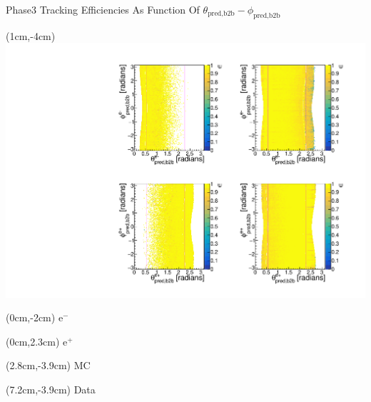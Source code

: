 \documentclass[8pt]{beamer}
\begin{document}
\begin{frame}{Phase3 Tracking Efficiencies As Function Of $\theta_{\textrm{pred,b2b}}-\phi_{\textrm{pred,b2b}}$}
	
	
	
	\begin{textblock*}{9cm}(1cm,-4cm)
		\includegraphics[width=\textwidth]{VPlots/P3/xCEffTP_MCDataP3}
	\end{textblock*}
	
	\begin{textblock*}{2cm}(0cm,-2cm)
		$\textrm{e}^-$
	\end{textblock*}
	
	\begin{textblock*}{2cm}(0cm,2.3cm)
		$\textrm{e}^+$
	\end{textblock*}
	
	
	\begin{textblock*}{2cm}(2.8cm,-3.9cm)
		MC
	\end{textblock*}
	
	\begin{textblock*}{2cm}(7.2cm,-3.9cm)
		Data
	\end{textblock*}
	
\end{frame}
\end{document}
